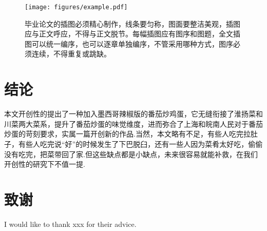 \begin{figure}[htb]
    \centering
    \texttt{[image: figures/example.pdf]}
    \caption{毕业论文的插图必须精心制作，线条要匀称，图面要整洁美观，插图应与正文呼应，不得与正文脱节。每幅插图应有图序和图题，全文插图可以统一编序，也可以逐章单独编序，不管采用哪种方式，图序必须连续，不得重复或跳缺。}
    \label{fig:1}
\end{figure}




\clearpage
\section{结论}
本文开创性的提出了一种加入墨西哥辣椒版的番茄炒鸡蛋，它无缝衔接了淮扬菜和川菜两大菜系，提升了番茄炒蛋的味觉维度，进而弥合了上海和皖南人民对于番茄炒蛋的苛刻要求，实属一篇开创新的作品.当然，本文略有不足，有些人吃完拉肚子，有些人吃完说“好”的时候发生了下巴脱臼，还有一些人因为菜肴太好吃，偷偷没有吃完，把菜带回了家.但这些缺点都是小缺点，未来很容易就能补救，在我们开创性的研究下不值一提.



\clearpage




\clearpage
\section*{致谢}
I would like to thank xxx for their advice.






